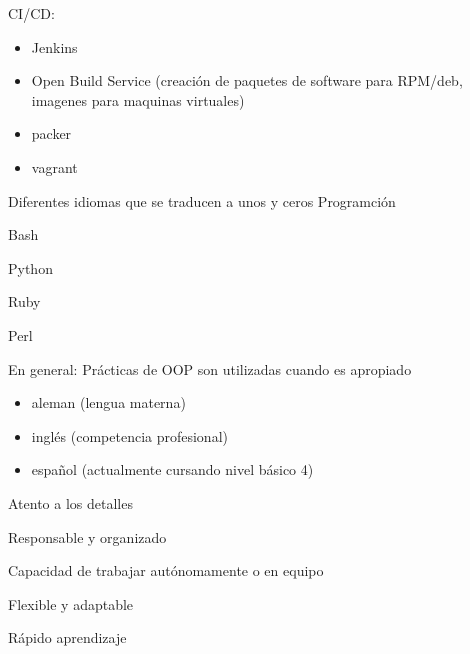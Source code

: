 \begin{cventries}
{\begin{cvitems}
\begin{itemize}
          \end{itemize}
      \item CI/CD:
        \begin{itemize}
          \item Jenkins
          \item Open Build Service (creación de paquetes de software para RPM/deb, imagenes para
            maquinas virtuales)
          \item packer
          \item vagrant
        \end{itemize}
      \end{cvitems}
    }

  \cventry
    {Diferentes idiomas que se traducen a unos y ceros}
    {Programción}
    {}
    {}
    {
      \begin{cvitems}
        \item Bash
        \item Python
        \item Ruby
        \item Perl
        \item En general: Prácticas de OOP son utilizadas cuando es apropiado
      \end{cvitems}
    }

\end{cventries}


\begin{cvparagraph}
  \begin{itemize}
    \item aleman (lengua materna)
    \item inglés (competencia profesional)
    \item español (actualmente cursando nivel básico 4)
  \end{itemize}
\end{cvparagraph}

\newline

\begin{cvparagraph}

\begin{cvitems}
  \item Atento a los detalles
  \item Responsable y organizado
  \item Capacidad de trabajar autónomamente o en equipo
  \item Flexible y adaptable
  \item Rápido aprendizaje
\end{cvitems}
\end{cvparagraph}



